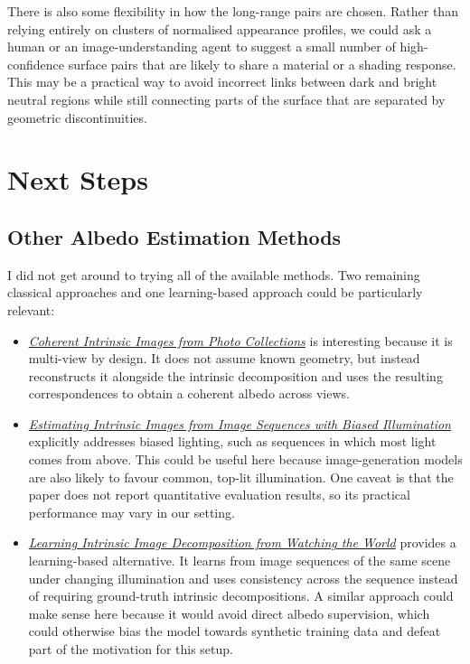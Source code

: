 \documentclass[11pt]{article}
\begin{document}
There is also some flexibility in how the long-range pairs are chosen. Rather
than relying entirely on clusters of normalised appearance profiles, we could
ask a human or an image-understanding agent to suggest a small number of
high-confidence surface pairs that are likely to share a material or a shading
response. This may be a practical way to avoid incorrect links between dark
and bright neutral regions while still connecting parts of the surface that
are separated by geometric discontinuities.

\clearpage
\section{Next Steps}

\subsection{Other Albedo Estimation Methods}

I did not get around to trying all of the available methods. Two remaining
classical approaches and one learning-based approach could be particularly
relevant:

\begin{itemize}
  \item \href{https://people.csail.mit.edu/sparis/publi/2012/sigasia_intrinsic/Laffont_12_Coherent_Intrinsic_Images.pdf}{\emph{Coherent Intrinsic Images from Photo Collections}}
  is interesting because it is multi-view by design. It does not assume known
  geometry, but instead reconstructs it alongside the intrinsic decomposition
  and uses the resulting correspondences to obtain a coherent albedo across
  views.

  \item \href{https://www.microsoft.com/en-us/research/wp-content/uploads/2016/02/eccv2004_intrinsic.pdf}{\emph{Estimating Intrinsic Images from Image Sequences with Biased Illumination}}
  explicitly addresses biased lighting, such as sequences in which most light
  comes from above. This could be useful here because image-generation models
  are also likely to favour common, top-lit illumination. One caveat is that
  the paper does not report quantitative evaluation results, so its practical
  performance may vary in our setting.

  \item \href{https://www.cs.cornell.edu/projects/bigtime/}{\emph{Learning Intrinsic Image Decomposition from Watching the World}}
  provides a learning-based alternative. It learns from image sequences of the
  same scene under changing illumination and uses consistency across the
  sequence instead of requiring ground-truth intrinsic decompositions. A
  similar approach could make sense here because it would avoid direct albedo
  supervision, which could otherwise bias the model towards synthetic training
  data and defeat part of the motivation for this setup.
\end{itemize}
\end{document}
